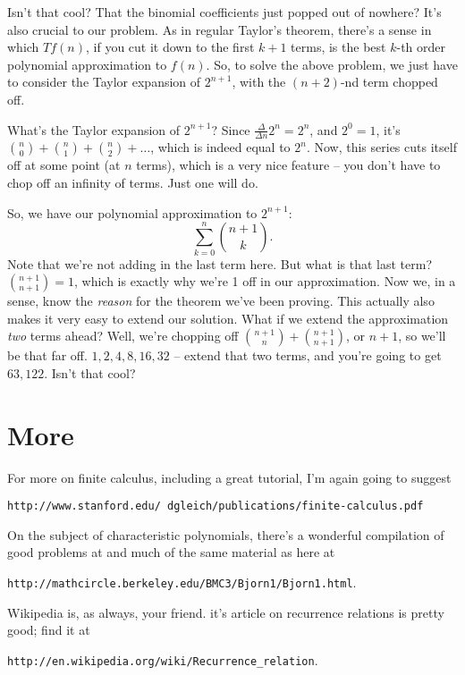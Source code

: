 \documentclass[12pt,letterpaper]{article}
\begin{document}
Isn't that cool? That the binomial coefficients just popped out of
nowhere? It's also crucial to our problem. As in regular Taylor's
theorem, there's a sense in which $T f(n)$, if you cut it down to the
first $k+1$ terms, is the best $k$-th order polynomial approximation
to $f(n)$. So, to solve the above problem, we just have to consider
the Taylor expansion of $2^{n+1}$, with the $(n+2)$-nd term chopped off.

What's the Taylor expansion of $2^{n+1}$? Since $\frac{\Delta}{\Delta
n} 2^n = 2^n$, and $2^0 = 1$, it's $\binom{n}{0} + \binom{n}{1} +
\binom{n}{2} + \ldots$, which is indeed equal to $2^n$. Now, this
series cuts itself off at some
point (at $n$ terms), which is a very nice feature -- you don't have
to chop off an infinity of terms. Just one will do.

So, we have our polynomial approximation to $2^{n+1}$:
$$\sum_{k=0}^{n} \binom{n+1}{k}.$$ Note that we're not adding in the
last term here. But what is that last term? $\binom{n+1}{n+1} = 1$,
which is exactly why we're 1 off in our approximation. Now we, in a
sense, know the \emph{reason} for the theorem we've been proving. This
actually also makes it very easy to extend our solution. What if we
extend the approximation \emph{two} terms ahead? Well, we're chopping
off $\binom{n+1}{n} + \binom{n+1}{n+1}$, or $n+1$, so we'll be that
far off. $1, 2, 4, 8, 16, 32$ -- extend that two terms, and you're
going to get $63, 122$. Isn't that cool?

\section{More}
For more on finite calculus, including a great tutorial, I'm again going to suggest
\begin{center}\texttt{http://www.stanford.edu/\string~dgleich/publications/finite-calculus.pdf}\end{center}

On the subject of characteristic polynomials, there's a wonderful
compilation of good problems at and much of the same material as here
at
\begin{center}\texttt{http://mathcircle.berkeley.edu/BMC3/Bjorn1/Bjorn1.html}.\end{center}

Wikipedia is, as always, your friend. it's article on recurrence
relations is pretty good; find it at
\begin{center}\texttt{http://en.wikipedia.org/wiki/Recurrence\string_relation}.\end{center}
\end{document}
